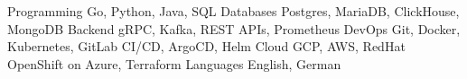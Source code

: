 \begin{cvskills}
  \cvskill
    {Programming}
    {Go, Python, Java, SQL}
  \cvskill
    {Databases}
    {Postgres, MariaDB, ClickHouse, MongoDB}
  \cvskill
    {Backend}
    {gRPC, Kafka, REST APIs, Prometheus}
  \cvskill
    {DevOps}
    {Git, Docker, Kubernetes, GitLab CI/CD, ArgoCD, Helm}
  \cvskill
    {Cloud}
    {GCP, AWS, RedHat OpenShift on Azure, Terraform}
  \cvskill
    {Languages}
    {English, German}
\end{cvskills}
